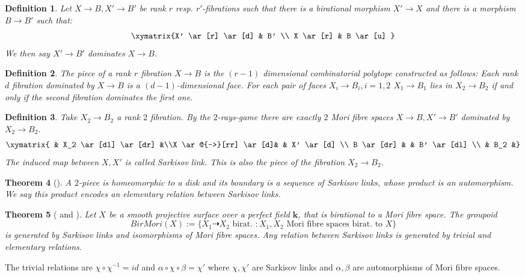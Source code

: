 \documentclass[12pt, oneside, reqno]{amsart}
\newtheorem{theorem}{Theorem}[section]
\newtheorem{definition}[theorem]{Definition}
\begin{document}
\begin{definition}
    Let $ X \rightarrow B, X' \rightarrow B'$ be rank $r$ resp. $r'$-fibrations such that there is a birational morphism $X' \rightarrow X$ and there is a morphism $B \rightarrow B'$ such that:
    \[\xymatrix{X' \ar[r] \ar[d] & B' \\ X \ar[r] & B \ar[u] }\]
    We then say $X' \rightarrow B'$ dominates $X \rightarrow B$.
\end{definition}
\begin{definition} \label{RPiece}
    The piece of a rank $r$ fibration $X \rightarrow B$ is the $(r-1)$ dimensional combinatorial polytope constructed as follows: Each rank $d$ fibration dominated by $X \rightarrow B$ is a $(d-1)$-dimensional face. For each pair of faces $X_i \rightarrow B_i, i=1,2$ $X_1 \rightarrow B_1$ lies in $X_2 \rightarrow B_2$ if and only if the second fibration dominates the first one.
\end{definition}
\begin{definition} \label{SarkisovLink}
    Take $X_2 \rightarrow B_2$ a rank $2$ fibration. By the $2$-rays-game there are exactly $2$ Mori fibre spaces $X \rightarrow B, X' \rightarrow B'$ dominated by $X_2 \rightarrow B_2$. 
    \[ \xymatrix{ & X_2 \ar[dl] \ar[dr] &\\X \ar@{-->}[rr] \ar[d]& & X' \ar[d] \\ B \ar[dr]  & & B' \ar[dl] \\ & B_2 &}\]
    The induced map between $X,X'$ is called Sarkisov link. This is also the piece of the fibration $X_2 \rightarrow B_2$.
\end{definition}

\begin{theorem}[\cite{Lamy_2020}] \label{ElementaryRelation}
    A $2$-piece is homeomorphic to a disk and its boundary is a sequence of Sarkisov links, whose product is an automorphism. We say this product encodes an elementary relation between Sarkisov links.
\end{theorem}
\begin{theorem}[\cite{Iskovskikh} and \cite{Lamy_2020}] \label{Isk}
    Let $X$ be a smooth projective surface over a perfect field $\textbf{k}$, that is birational to a Mori fibre space. The groupoid 
    \[BirMori(X) := \{X_1 \dashrightarrow X_2 \text{ birat. } : X_1,X_2 \text{ Mori fibre spaces birat. to } X\} \]
    is generated by Sarkisov links and isomorphisms of Mori fibre spaces. Any relation between Sarkisov links is generated by trivial and elementary relations.
\end{theorem}
\noindent
The trivial relations are $\chi \circ \chi^{-1} = id$ and $\alpha \circ \chi \circ \beta = \chi'$ where $\chi, \chi'$ are Sarkisov links and $\alpha, \beta $ are automorphisms of Mori fibre spaces.
\end{document}
